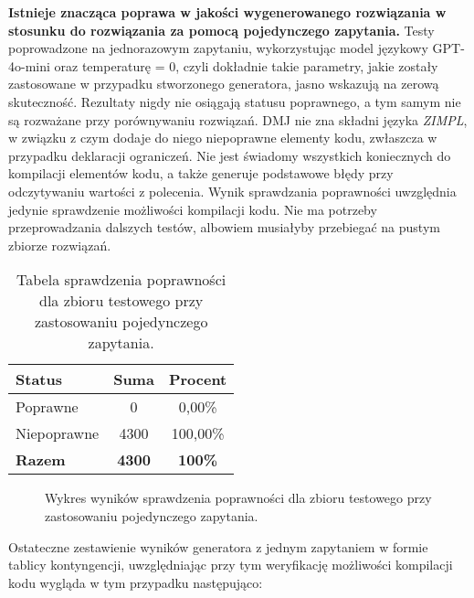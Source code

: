 \textbf{Istnieje znacząca poprawa w jakości wygenerowanego rozwiązania w stosunku do rozwiązania za pomocą pojedynczego zapytania.} Testy poprowadzone na jednorazowym zapytaniu, wykorzystując model językowy GPT-4o-mini oraz temperaturę = 0, czyli dokładnie takie parametry, jakie zostały zastosowane w przypadku stworzonego generatora, jasno wskazują na zerową skuteczność. Rezultaty nigdy nie osiągają statusu poprawnego, a tym samym nie są rozważane przy porównywaniu rozwiązań. DMJ nie zna składni języka  \textit{ZIMPL}, w związku z czym dodaje do niego niepoprawne elementy kodu, zwłaszcza w przypadku deklaracji ograniczeń. Nie jest świadomy wszystkich koniecznych do kompilacji elementów kodu, a także generuje podstawowe błędy przy odczytywaniu wartości z polecenia. Wynik sprawdzania poprawności uwzględnia jedynie sprawdzenie możliwości kompilacji kodu. Nie ma potrzeby przeprowadzania dalszych testów, albowiem musiałyby przebiegać na pustym zbiorze rozwiązań.

\begin{table}[ht]
\caption{Tabela sprawdzenia poprawności dla zbioru testowego przy zastosowaniu pojedynczego zapytania.}\label{tab:tabela10}
\centering%
\begin{tabular}{|l|c|c|}
\hline
\textbf{Status} & \textbf{Suma} & \textbf{Procent} \\
\hline
Poprawne & 0 & 0,00\% \\
\hline
Niepoprawne & 4300 & 100,00\% \\
\hline
\textbf{Razem} & \textbf{4300} & \textbf{100\%} \\
\hline
\end{tabular}
\end{table}

\begin{figure}[H]
\centering
{}
\caption{Wykres wyników sprawdzenia poprawności dla zbioru testowego przy zastosowaniu pojedynczego zapytania.}\label{rys:plama2j}
\end{figure}

Ostateczne zestawienie wyników generatora z jednym zapytaniem w formie tablicy kontyngencji, uwzględniając przy tym weryfikację możliwości kompilacji kodu wygląda w tym przypadku następująco:

